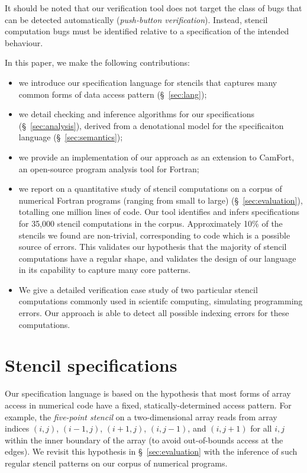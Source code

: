 \documentclass[10pt,preprint]{sigplanconf}
\theoremstyle{definition}
\begin{document}
It should be noted that our verification tool does not target the
class of bugs that can be detected automatically (\emph{push-button
  verification}). Instead, stencil computation bugs must be
identified relative to a specification of the intended behaviour.

In this paper, we make the following contributions:
%
\begin{itemize}
\item we introduce our specification language for stencils
  that captures many common forms of data access pattern
  (\S~\ref{sec:lang});

\item we detail checking and inference algorithms for our
  specifications (\S~\ref{sec:analysis}), derived from a
  denotational model for the specificaiton language
  (\S~\ref{sec:semantics});

\item we provide an implementation of our approach as an extension to
  CamFort, an open-source program analysis tool for Fortran;

\item we report on a quantitative study of stencil computations on a
  corpus of numerical Fortran programs (ranging from small to large)
  (\S~\ref{sec:evaluation}), totalling one million lines of code. Our tool
  identifies and infers specifications for 35,000 stencil computations in the
  corpus. Approximately 10\% of the stencils we found are non-trivial,
  corresponding to code which is a possible source of errors. This validates
  our hypothesis that the majority of stencil computations have a regular
  shape, and validates the design of our language in its capability to capture
  many core patterns.

\item We give a detailed verification case study of two
  particular stencil computations commonly used in scientifc computing,
  simulating programming errors. Our approach is able to detect all
  possible indexing errors for these computations.
\end{itemize}
%

\newcommand{\domainVal}{\mathbb{Z}_\infty}
\section{Stencil specifications}

Our specification language is based on the hypothesis
that most forms of array access in numerical code have
a fixed, statically-determined access pattern. For example, the
\emph{five-point stencil} on a two-dimensional array reads from array
indices $(i, j)$, $(i-1, j)$, $(i+1, j)$, $(i, j-1)$, and $(i, j+1)$
for all $i, j$ within the inner boundary of the array (to avoid
out-of-bounds access at the edges). We revisit this hypothesis
in \S~\ref{sec:evaluation} with the inference of
such regular stencil patterns on our corpus of numerical programs.
\end{document}
